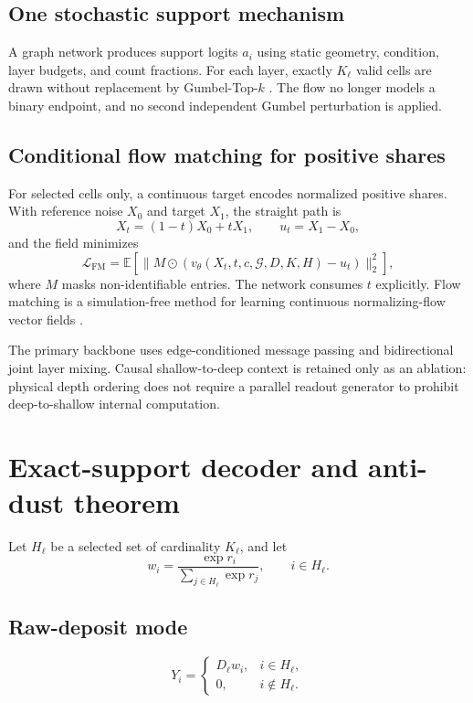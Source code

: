 \documentclass[10pt,a4paper]{article}
\begin{document}
\subsection{One stochastic support mechanism}
A graph network produces support logits $a_i$ using static geometry, condition, layer budgets, and count fractions. For each layer, exactly $K_\ell$ valid cells are drawn without replacement by Gumbel-Top-$k$ \cite{gumbel_topk}. The flow no longer models a binary endpoint, and no second independent Gumbel perturbation is applied.

\subsection{Conditional flow matching for positive shares}
For selected cells only, a continuous target encodes normalized positive shares. With reference noise $X_0$ and target $X_1$, the straight path is
\begin{equation}
 X_t=(1-t)X_0+tX_1,\qquad u_t=X_1-X_0,
\end{equation}
and the field minimizes
\begin{equation}
 \mathcal L_{\mathrm{FM}}=\mathbb E\left[\lVert M\odot(v_\theta(X_t,t,c,\mathcal G,D,K,H)-u_t)\rVert_2^2\right],
 \label{eq:fm}
\end{equation}
where $M$ masks non-identifiable entries. The network consumes $t$ explicitly. Flow matching is a simulation-free method for learning continuous normalizing-flow vector fields \cite{flow_matching}.

The primary backbone uses edge-conditioned message passing and bidirectional joint layer mixing. Causal shallow-to-deep context is retained only as an ablation: physical depth ordering does not require a parallel readout generator to prohibit deep-to-shallow internal computation.

\section{Exact-support decoder and anti-dust theorem}

Let $H_\ell$ be a selected set of cardinality $K_\ell$, and let
\begin{equation}
 w_i=\frac{\exp r_i}{\sum_{j\in H_\ell}\exp r_j},\qquad i\in H_\ell.
\end{equation}

\subsection{Raw-deposit mode}
\begin{equation}
 Y_i=\begin{cases}D_\ell w_i,&i\in H_\ell,\\0,&i\notin H_\ell.\end{cases}
 \label{eq:rawdecode}
\end{equation}
\end{document}
